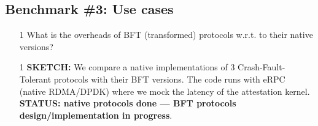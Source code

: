 \subsection{Benchmark \#3: Use cases}
\begin{itemize}
    \item[1] What is the overheads of BFT (transformed) protocols w.r.t. to their native versions?
\end{itemize}
{\color{blue} 
\begin{itemize}
    \item[1] {\bf SKETCH:} We compare a native implementations of 3 Crash-Fault-Tolerant protocols with their BFT versions. The code runs with eRPC (native RDMA/DPDK) where we mock the latency of the attestation kernel.
    \\ {\bf STATUS: native protocols done --- BFT protocols design/implementation in progress}.
\end{itemize}
}
